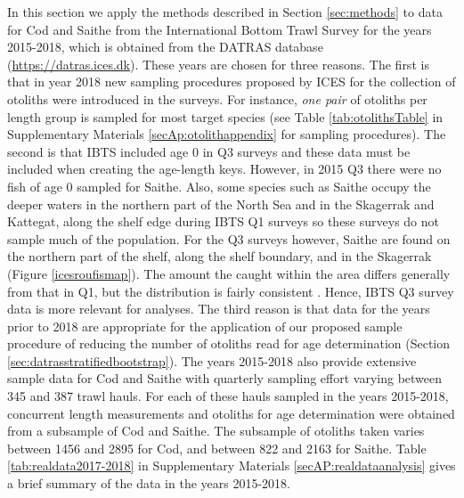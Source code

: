 \documentclass[a4paper 12pt]{article}
\numberwithin{equation}{section}
\begin{document}
In this section we apply the methods described in Section \ref{sec:methods} to data for Cod and Saithe from the International Bottom Trawl Survey for the years 2015-2018, which is obtained from the DATRAS database (\href{https://datras.ices.dk}{https://datras.ices.dk}). These years are chosen for three reasons. The first is that in year 2018 new sampling procedures proposed by ICES for the collection of otoliths were introduced in the surveys. For instance, \textit{one pair} of otoliths per length group is sampled for most target species (see Table \ref{tab:otolithsTable} in Supplementary Materials \ref{secAp:otolithappendix} for sampling procedures). The second is that IBTS included age 0 in Q3 surveys and these data must be included when creating the age-length keys. However, in 2015 Q3 there were no fish of age 0 sampled for Saithe. Also, some species such as Saithe occupy the deeper waters in the northern part of the North Sea and in the Skagerrak and Kattegat, along the shelf edge \citep{ICESFishMaps} during IBTS Q1 surveys so these surveys do not sample much of the population. For the Q3 surveys however,  Saithe are found on the northern part of the shelf, along the shelf boundary, and in the Skagerrak (Figure \ref{icesroufismap}). The amount the caught within the area differs generally from that in  Q1, but the distribution is fairly consistent  \citep{ICES2016Report}. Hence, IBTS Q3 survey data is more relevant for analyses. The third reason is that data for the years prior to 2018 are appropriate for the application of our proposed sample procedure of reducing the number of otoliths read for age determination (Section \ref{sec:datrasstratifiedbootstrap}). The years 2015-2018 also provide extensive sample data for Cod and Saithe with quarterly sampling effort varying between 345 and 387 trawl hauls.  For each of these hauls sampled in the years 2015-2018, concurrent length measurements and otoliths for age determination were obtained from a subsample of Cod and Saithe. The subsample of otoliths taken varies between 1456 and 2895 for Cod, and between 822 and 2163 for Saithe.  Table \ref{tab:realdata2017-2018}  in Supplementary Materials \ref{secAP:realdataanalysis} gives a brief summary of the data in the years 2015-2018.
\end{document}

